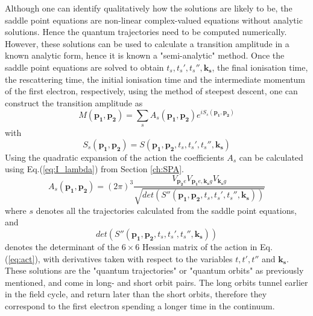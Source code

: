\documentclass[11pt]{article}
\numberwithin{equation}{section}
\begin{document}
Although one can identify qualitatively how the solutions are likely to be, the saddle point equations are non-linear complex-valued equations without analytic solutions. Hence the quantum trajectories need to be computed numerically. However, these solutions can be used to calculate a transition amplitude in a known analytic form, hence it is known a "semi-analytic" method. Once the saddle point equations are solved to obtain $t_s, t_s', t_s'', \mathbf{k_s}$, the final ionisation time, the rescattering time, the initial ionisation time and the intermediate momentum of the first electron, respectively, using the method of steepest descent, one can construct the transition amplitude as
\begin{equation}
    M(\mathbf{p_1}, \mathbf{p_2}) = \sum_s A_s(\mathbf{p_1}, \mathbf{p_2}) e^{iS_s(\mathbf{p_1}, \mathbf{p_2})}
\end{equation}
with 
\begin{equation}\label{eq:act}
    S_s(\mathbf{p_1}, \mathbf{p_2}) = S(\mathbf{p_1}, \mathbf{p_2}, t_s, t_s', t_s'', \mathbf{k_s})
\end{equation}
Using the quadratic expansion of the action the coefficients $A_s$ can be calculated using Eq.(\ref{eq:I_lambda}) from Section \ref{ch:SPA}.
\begin{equation}
    A_s(\mathbf{p_1}, \mathbf{p_2}) = (2\pi)^3 \frac{V_{\mathbf{p_2}e}V_{\mathbf{p_1}e,\mathbf{k_s}g}V_{\mathbf{k_s}g}}{\sqrt{det\left ( S''(\mathbf{p_1}, \mathbf{p_2}, t_s, t_s', t_s'', \mathbf{k_s})\right )}}
\end{equation}
\newline
where $s$ denotes all the trajectories calculated from the saddle point equations, and 
\begin{equation}
    det(S''(\mathbf{p_1}, \mathbf{p_2}, t_s, t_s', t_s'', \mathbf{k_s}))
\end{equation}
denotes the determinant of the $6 \times 6$ Hessian matrix of the action in Eq. (\ref{eq:act}), with derivatives taken with respect to the variables $t, t', t''$ and $\mathbf{k_s}$.
These solutions are the "quantum trajectories" or "quantum orbits" as previously mentioned, and come in long- and short orbit pairs. The long orbits tunnel earlier in the field cycle, and return later than the short orbits, therefore they correspond to the first electron spending a longer time in the continuum. 
\par
\end{document}
